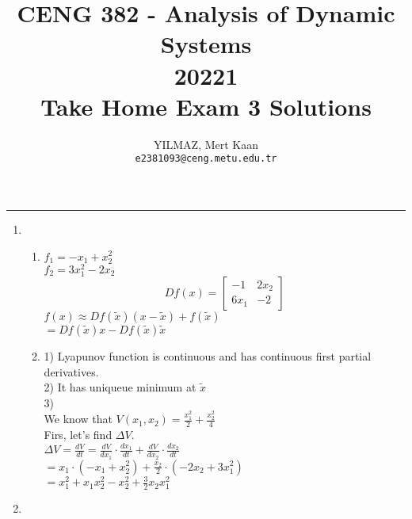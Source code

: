\documentclass[12pt,a4paper, margin=1in]{article}
\author{
  YILMAZ, Mert Kaan\\
  \texttt{e2381093@ceng.metu.edu.tr}
}
\title{CENG 382 - Analysis of Dynamic Systems \\
20221\\
Take Home Exam 3 Solutions}
\begin{document}
\maketitle

\noindent\rule{19cm}{1.2pt}

\begin{enumerate}

    \item %
        \begin{enumerate}
            \item 
            $f_1 = -x_1 + x_2^2$\\
            $f_2 = 3x_1^2 - 2x_2$\\
            \begin{equation*}
            Df(x) = 
            \begin{bmatrix}
                -1 & 2x_2\\
                6x_1 & -2
            \end{bmatrix}
            \end{equation*}
            $f(x) \approx Df(\tilde{x})(x-\tilde{x})+f(\tilde{x})$\\
            $= Df(\tilde{x})x - Df(\tilde{x})\tilde{x}$\\
            
            \item 
            1) Lyapunov function is continuous and has continuous first partial derivatives.\\
            2) It has uniqueue minimum at $\tilde{x}$\\
            3) \\
            We know that $V(x_1, x_2) = \frac{x_1^2}{2} + \frac{x_2^2}{4}$\\
            Firs, let's find $\Delta V$.\\
            $\Delta V =  \frac{dV}{dt} = \frac{dV}{dx_1}\cdot\frac{dx_1}{dt} + \frac{dV}{dx_2}\cdot\frac{dx_2}{dt}$\\
            $= x_1\cdot(-x_1+x_2^2) + \frac{x_2}{2}\cdot(-2x_2+3x_1^2)$\\
            $=x_1^2 + x_1x_2^2 - x_2^2 + \frac{3}{2}x_2x_1^2$
            
        \end{enumerate}
        
        
    \item %
        

\end{enumerate}
\end{document}
